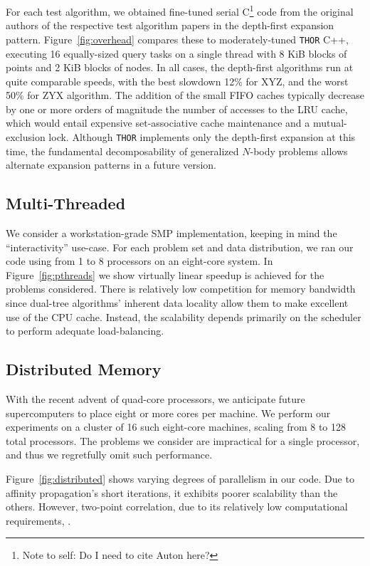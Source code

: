 \documentclass[twoside,leqno,twocolumn]{article}
\newcommand{\THOR}{{{\tt THOR}} }
\newcommand{\authornote}[1]{\footnote{Note to self: #1}}
\newcommand{\authorsnote}[1]{\authornote{#1}}
\newcommand{\fig}[1]{Figure~\ref{fig:#1}}
\begin{document}
For each test algorithm, we obtained fine-tuned serial C\authorsnote{Do I need to cite Auton here?} code from the original authors of the respective test algorithm papers \cite{various, algorithms, WALDO} in the depth-first expansion pattern.
\fig{overhead} compares these to moderately-tuned \THOR C++, executing 16 equally-sized query tasks on a single thread with 8 KiB blocks of points and 2 KiB blocks of nodes.
In all cases, the depth-first algorithms run at quite comparable speeds, with the best slowdown 12\% for XYZ, and the worst 50\% for ZYX algorithm.
The addition of the small FIFO caches typically decrease by one or more orders of magnitude the number of accesses to the LRU cache, which would entail expensive set-associative cache maintenance and a mutual-exclusion lock.
Although \THOR implements only the depth-first expansion at this time, the fundamental decomposability of generalized $N$-body problems allows alternate expansion patterns in a future version.

\subsection{Multi-Threaded}

We consider a workstation-grade SMP implementation, keeping in mind the ``interactivity'' use-case.
For each problem set and data distribution, we ran our code using from 1 to 8 processors on an eight-core system.
In \fig{pthreads} we show virtually linear speedup is achieved for the problems considered.
There is relatively low competition for memory bandwidth since dual-tree algorithms' inherent data locality allow them to make excellent use of the CPU cache.
Instead, the scalability depends primarily on the scheduler to perform adequate load-balancing.

\subsection{Distributed Memory}

With the recent advent of quad-core processors, we anticipate future supercomputers to place eight or more cores per machine.
We perform our experiments on a cluster of 16 such eight-core machines, scaling from 8 to 128 total processors.
The problems we consider are impractical for a single processor, and thus we regretfully omit such performance.

\fig{distributed} shows varying degrees of parallelism in our code.
Due to affinity propagation's short iterations, it exhibits poorer scalability than the others.
However, two-point correlation, due to its relatively low computational requirements, .
\end{document}
